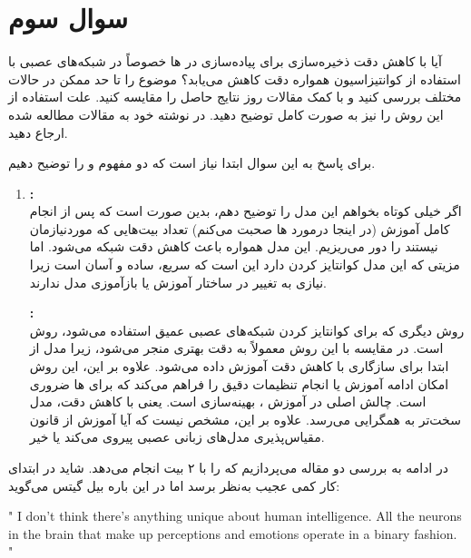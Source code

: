 \section{سوال سوم}
آیا با کاهش دقت ذخیره‌سازی برای پیاده‌سازی در ها خصوصاً در شبکه‌های عصبی با استفاده از کوانتیزاسیون همواره دقت کاهش می‌یابد؟ موضوع را تا حد ممکن در حالات مختلف بررسی کنید و با کمک مقالات روز نتایج حاصل را مقایسه کنید. علت استفاده از این روش را نیز به صورت کامل توضیح دهید. در نوشته خود به مقالات مطالعه شده ارجاع دهید.




\begin{qsolve}
	برای پاسخ به این سوال ابتدا نیاز است که دو مفهوم  و  را توضیح دهیم.
	
	\begin{enumerate}
		\item 
		\textbf{:}\\
		اگر خیلی کوتاه بخواهم این مدل را توضیح دهم، بدین صورت است که پس از انجام کامل آموزش (در اینجا درمورد  ها صحبت می‌کنم) تعداد بیت‌هایی که موردنیازمان نیستند را دور می‌ریزیم. این مدل همواره باعث کاهش دقت شبکه می‌شود. اما مزیتی که این مدل کوانتایز کردن دارد این است که سریع، ساده و آسان است زیرا نیازی به تغییر در ساختار آموزش یا بازآموزی مدل ندارند. \cite{ref1}
		
		
		\textbf{:}\\
		روش دیگری که برای کوانتایز کردن شبکه‌های عصبی عمیق استفاده می‌شود، روش  است. در مقایسه با  این روش معمولاً به دقت بهتری منجر می‌شود، زیرا مدل از ابتدا برای سازگاری با کاهش دقت آموزش داده می‌شود. علاوه بر این، این روش امکان ادامه آموزش یا انجام تنظیمات دقیق را فراهم می‌کند که برای  ها ضروری است. چالش اصلی در آموزش  ، بهینه‌سازی است. یعنی با کاهش دقت، مدل سخت‌تر به همگرایی می‌رسد. علاوه بر این، مشخص نیست که آیا آموزش  از قانون مقیاس‌پذیری مدل‌های زبانی عصبی پیروی می‌کند یا خیر. \cite{ref1}
	\end{enumerate}
	
	
	در ادامه به بررسی دو مقاله می‌پردازیم که  را با ۲ بیت انجام می‌دهد. شاید در ابتدای کار کمی عجیب به‌نظر برسد اما در این باره بیل گیتس می‌گوید:
	
	\begin{latin}
		" I don’t think there’s anything unique about human intelligence. All the neurons in the brain that make up perceptions and emotions operate in a binary fashion. "
	\end{latin}
	

\end{qsolve}
